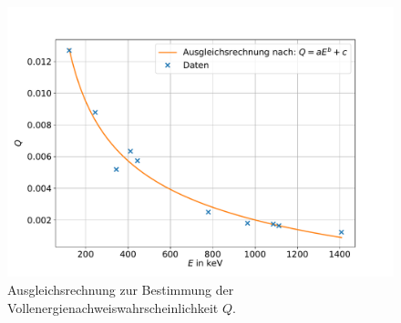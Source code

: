 \begin{figure}[h!]
  \centering
  \includegraphics[width=\textwidth]{content/images/vollenergienachweiswahrscheinlichkeit.pdf}
  \caption{Ausgleichsrechnung zur Bestimmung der Vollenergienachweiswahrscheinlichkeit $Q$.}
  \label{fig:vw}
\end{figure}
